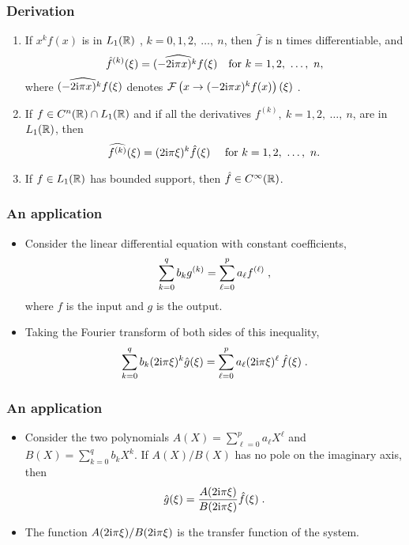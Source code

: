 \begin{frame}
\frametitle{Derivation}

\begin{theorem}
\begin{enumerate}[label=(\roman*)]
\item If $x^{k}f(x)$ is in $L_1(\mathbb{R})$ , $k=0,1,2,\ \ldots,\ n$,  then $\hat{f}$ is n   times differentiable, and
$$
\hat{f}^{(k)}(\xi)=\widehat{(-2\mathrm{i}\pi x)^{k}f}(\xi) \quad  \text{for} \ k=1,2,\ \ldots,\ n,
$$
where $\widehat{(-2 \mathrm{i} \pi x)^{k}f}(\xi)$  denotes $\mathcal{F}\left( x \to (-2\mathrm{i}\pi x)^{k}f(x) \right)(\xi)$ .
\item If $f\in C^{n}(\mathbb{R})\cap L_1(\mathbb{R})$ and if all the derivatives $f^{(k)},\ k=1,2,\ \ldots,\ n$, are  in $L_1(\mathbb{R})$, then
$$
\widehat{f^{(k)}}(\xi)=(2\rmi \pi\xi)^{k}\hat{f}(\xi)\ \quad \text{for}\ k=1,2,\ \ldots,\ n.
$$
\item If $f\in L_1(\mathbb{R})$  has bounded support, then $\hat{f}\in C^{\infty}(\mathbb{R})$.
\end{enumerate}
\end{theorem}
\end{frame}

\begin{frame}
\frametitle{An application}
\begin{itemize}
\item Consider the linear differential equation with constant coefficients,
\[
\sum_{k=0}^q b_k g^{(k)} = \sum_{\ell=0}^p a_{\ell} f^{(\ell)} \;,
\]
where $f$ is the \alert{input} and $g$ is the \alert{output}.
\item Taking the Fourier transform of both sides of this inequality,
\[
\sum_{k=0}^q  b_k (2 \mathrm{i} \pi \xi)^k \hat{g}(\xi) = \sum_{\ell=0}^p a_{\ell} (2 \mathrm{i} \pi \xi)^\ell \, \hat{f}(\xi) \;.
\]
\end{itemize}
\end{frame}

\begin{frame}
\frametitle{An application}
\begin{itemize}
\item Consider the two polynomials $A(X)= \sum_{\ell=0}^p a_{\ell} X^{\ell}$ and $B(X)= \sum_{k=0}^q b_k X^k$. If $A(X)/B(X)$ has no pole on the imaginary axis, then
\[
\hat{g}(\xi)= \frac{A(2 \mathrm{i} \pi \xi)}{B(2 \mathrm{i} \pi \xi)} \hat{f}(\xi) \;.
\]
\item The function $A(2 \mathrm{i} \pi \xi)/B(2 \mathrm{i} \pi \xi)$ is the \alert{transfer function} of the system.
\end{itemize}
\end{frame}

